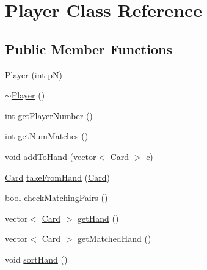 \hypertarget{class_player}{\section{Player Class Reference}
\label{class_player}
}
\subsection*{Public Member Functions}
\begin{DoxyCompactItemize}
\item 
\hyperlink{class_player_a80d1293f6f49b886db318f1dae7be23b}{Player} (int p\-N)
\item 
\hyperlink{class_player_a749d2c00e1fe0f5c2746f7505a58c062}{$\sim$\-Player} ()
\item 
int \hyperlink{class_player_ae72235dee0a2f7abbcb82002164623aa}{get\-Player\-Number} ()
\item 
int \hyperlink{class_player_abdea2b45e1a98e9942bdaca85f451734}{get\-Num\-Matches} ()
\item 
void \hyperlink{class_player_ace93c12489cea500770591ccb47a2a0c}{add\-To\-Hand} (vector$<$ \hyperlink{class_card}{Card} $>$ c)
\item 
\hyperlink{class_card}{Card} \hyperlink{class_player_aa98f63d75da7cae403510b4c1e2a6ce9}{take\-From\-Hand} (\hyperlink{class_card}{Card})
\item 
bool \hyperlink{class_player_adf635ce5997b0d4647a6f7d09b526dac}{check\-Matching\-Pairs} ()
\item 
vector$<$ \hyperlink{class_card}{Card} $>$ \hyperlink{class_player_a6ca673336972f29fdc094b3f0f1f7f84}{get\-Hand} ()
\item 
vector$<$ \hyperlink{class_card}{Card} $>$ \hyperlink{class_player_a09fbf15e6a001feea60cb53d02ec3912}{get\-Matched\-Hand} ()
\item 
void \hyperlink{class_player_a2369527c90f1168eac2dc3f7bfaefc43}{sort\-Hand} ()
\end{DoxyCompactItemize}


